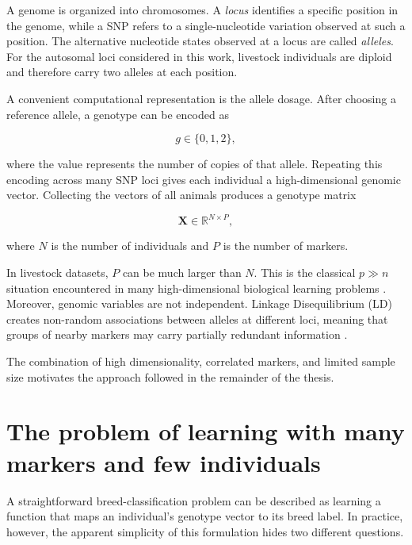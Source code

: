 A genome is organized into chromosomes. A \emph{locus} identifies a
specific position in the genome, while a SNP refers to a
single-nucleotide variation observed at such a position. The
alternative nucleotide states observed at a locus are called
\emph{alleles}. For the autosomal loci considered in this work,
livestock individuals are diploid and therefore carry two alleles at
each position.

A convenient computational representation is the allele dosage. After
choosing a reference allele, a genotype can be encoded as

\begin{equation}
    g \in \{0,1,2\},
\end{equation}

where the value represents the number of copies of that allele.
Repeating this encoding across many SNP loci gives each individual a
high-dimensional genomic vector. Collecting the vectors of all
animals produces a genotype matrix

\begin{equation}
    \mathbf{X}\in\mathbb{R}^{N\times P},
\end{equation}

where $N$ is the number of individuals and $P$ is the number of
markers.

In livestock datasets, $P$ can be much larger than $N$. This is the
classical $p\gg n$ situation encountered in many high-dimensional
biological learning problems
\cite{saeys2007feature, chafai2023mlanimal}. Moreover, genomic
variables are not independent. Linkage Disequilibrium (LD) creates
non-random associations between alleles at different loci, meaning
that groups of nearby markers may carry partially redundant
information \cite{slatkin2008linkage, pritchard2001linkage}.

The combination of high dimensionality, correlated markers, and
limited sample size motivates the approach followed in the remainder
of the thesis.

\section{The problem of learning with many markers and few individuals}
\label{sec:high_dimensional_genomic_learning}

A straightforward breed-classification problem can be described as
learning a function that maps an individual's genotype vector to its
breed label. In practice, however, the apparent simplicity of this
formulation hides two different questions.

